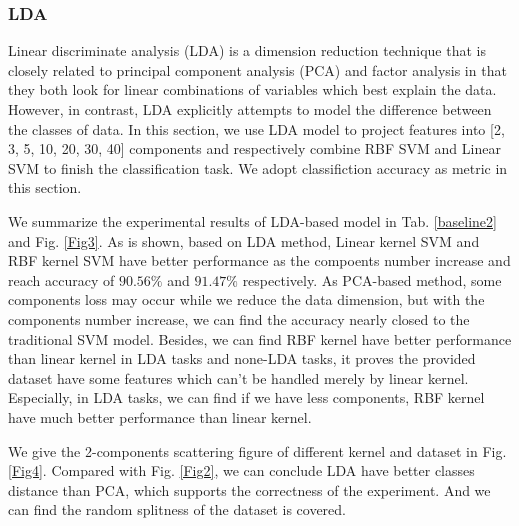 \documentclass{article}
\begin{document}
\subsubsection{LDA}

Linear discriminate analysis (LDA) is a dimension reduction technique that is closely related to principal component analysis (PCA) and factor analysis in that they both look for linear combinations of variables which best explain the data. However, in contrast, LDA explicitly attempts to model the difference between the classes of data. In this section, we use LDA model to project features into [2, 3, 5, 10, 20, 30, 40] components and respectively combine RBF SVM and Linear SVM to finish the classification task. We adopt classifiction accuracy as metric in this section.

We summarize the experimental results of LDA-based model in Tab. \ref{baseline2} and Fig. \ref{Fig3}. As is shown, based on LDA method, Linear kernel SVM and RBF kernel SVM have better performance as the compoents number increase and reach accuracy of $90.56\%$ and $91.47\%$ respectively. As PCA-based method, some components loss may occur while we reduce the data dimension, but with the components number increase, we can find the accuracy nearly closed to the traditional SVM model. Besides, we can find RBF kernel have better performance than linear kernel in LDA tasks and none-LDA tasks, it proves the provided dataset have some features which can't be handled merely by linear kernel. Especially, in LDA tasks, we can find if we have less components, RBF kernel have much better performance than linear kernel.

We give the 2-components scattering figure of different kernel and dataset in Fig. \ref{Fig4}. Compared with Fig. \ref{Fig2}, we can conclude LDA have better classes distance than PCA, which supports the correctness of the experiment. And we can find the random splitness of the dataset is covered.
\end{document}
